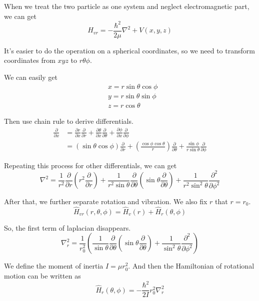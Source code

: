 \documentclass[letterpaper]{article}
\newcommand{\pd}[2]{\frac{\partial #1}{\partial #2}}
\newcommand{\pdd}[2]{\frac{\partial^2 #1}{\partial #2^2}}
\begin{document}
When we treat the two particle as one system and neglect electromagnetic part, we can get
\begin{equation*}
    \hat{H}_{vr}=-\frac{\hbar^2}{2\mu}\nabla^2+V(x,y,z)
\end{equation*}

It's easier to do the operation on a spherical coordinates, so we need to transform coordinates from
$xyz$ to $r\theta\phi$.

We can easily get
\begin{equation*}
    \begin{aligned}
         & x=r\sin\theta\cos\phi \\
         & y=r\sin\theta\sin\phi \\
         & z=r\cos\theta
    \end{aligned}
\end{equation*}

Then use chain rule to derive differentials.
\begin{equation*}
    \begin{aligned}
        \pd{}{x} & =\pd{r}{x}\pd{}{r}+\pd{\theta}{x}\pd{}{\theta}+\pd{\phi}{x}\pd{}{\phi}    \\
                 & =(\sin\theta\cos\phi)\pd{}{r}+(\frac{\cos\phi\cos\theta}{r})\pd{}{\theta}
        +\frac{\sin\phi}{r\sin\theta}\pd{}{\phi}
    \end{aligned}
\end{equation*}

Repeating this process for other differentials, we can get
\begin{equation*}
    \nabla^2=\frac{1}{r^2}\pd{}{r}(r^2\pd{}{r})+\frac{1}{r^2\sin\theta}\pd{}{\theta}(\sin\theta\pd{}{\theta})
    +\frac{1}{r^2\sin^2\theta}\pdd{}{\phi}
\end{equation*}

After that, we further separate rotation and vibration. We also fix $r$ that $r=r_0$.
\begin{equation*}
    \hat{H}_{vr}(r,\theta,\phi)=\hat{H}_v(r)+\hat{H}_r(\theta,\phi)
\end{equation*}

So, the first term of laplacian disappears.
\begin{equation*}
    \nabla_r^2=\frac{1}{r_0^2}\left(\frac{1}{\sin\theta}\pd{}{\theta}(\sin\theta\pd{}{\theta})
    +\frac{1}{\sin^2\theta}\pdd{}{\phi}\right)
\end{equation*}

We define the moment of inertia $I=\mu r_0^2$. And then the Hamiltonian of rotational motion
can be written as
\begin{equation*}
    \hat{H}_r(\theta,\phi)=-\frac{\hbar^2}{2I}r_0^2\nabla_r^2
\end{equation*}
\end{document}
